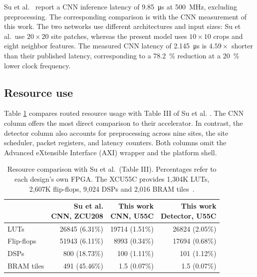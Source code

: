 Su et al.~\cite{su2026} report a CNN inference latency of \SI{9.85}{\micro\second} at \SI{500}{\mega\hertz}, excluding preprocessing. The corresponding comparison is with the CNN measurement of this work. The two networks use different architectures and input sizes: Su et al.\ use $20\times20$ site patches, whereas the present model uses $10\times10$ crops and eight neighbor features.
The measured CNN latency of \SI{2.145}{\micro\second} is $4.59\times$ shorter than their published latency, corresponding to a \SI{78.2}{\percent} reduction at a \SI{20}{\percent} lower clock frequency.

\subsection{Resource use}\label{sec:hardware-resources}

Table \ref{tab:hardware-resources} compares routed resource usage with Table III of Su et al. \cite{su2026}. The CNN column offers the most direct comparison to their accelerator. In contrast, the detector column also accounts for preprocessing across nine sites, the site scheduler, packet registers, and latency counters. Both columns omit the Advanced eXtensible Interface (AXI) wrapper and the platform shell.

\begin{table}[H]
    \centering
    \small
    \setlength{\tabcolsep}{5pt}
    \caption[Resource comparison with Su et al.\ (Table III).]{Resource comparison with Su et al.\ (Table III). Percentages refer to each design's own FPGA. The XCU55C provides 1,304K LUTs, 2,607K flip-flops, 9,024 DSPs and 2,016 BRAM tiles~\cite{amd2026u55c}.}
    \label{tab:hardware-resources}
    \begin{tabular}{@{}lrrr@{}}
        \toprule
        & \shortstack{Su et al.\\CNN, ZCU208}
        & \shortstack{This work\\CNN, U55C}
        & \shortstack{This work\\Detector, U55C} \\
        \midrule
        LUTs & \num{26845} (6.31\%) & \num{19714} (1.51\%) & \num{26824} (2.05\%) \\
        Flip-flops & \num{51943} (6.11\%) & \num{8993} (0.34\%) & \num{17694} (0.68\%) \\
        DSPs & \num{800} (18.73\%) & \num{100} (1.11\%) & \num{101} (1.12\%) \\
        BRAM tiles & \num{491} (45.46\%) & \num{1.5} (0.07\%) & \num{1.5} (0.07\%) \\
        \bottomrule
    \end{tabular}
\end{table}

